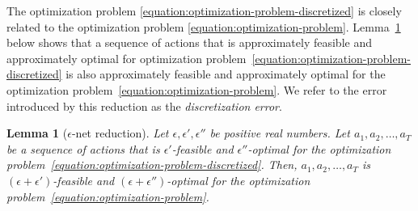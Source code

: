 \documentclass[12pt]{article}
\newtheorem{lemma}[theorem]{Lemma}
\theoremstyle{definition}
\begin{document}
The optimization problem \eqref{equation:optimization-problem-discretized} is
closely related to the optimization problem
\eqref{equation:optimization-problem}. Lemma~\ref{lemma:epsilon-net-reduction}
below shows that a sequence of actions that is approximately feasible and
approximately optimal for optimization
problem~\eqref{equation:optimization-problem-discretized} is also approximately
feasible and approximately optimal for the optimization
problem~\eqref{equation:optimization-problem}. We refer to the error introduced
by this reduction as the \emph{discretization error}.

\begin{lemma}[$\epsilon$-net reduction]
\label{lemma:epsilon-net-reduction}
Let $\epsilon, \epsilon', \epsilon''$ be positive real numbers. Let
$a_1, a_2, \dots, a_T$ be a sequence of actions that is $\epsilon'$-feasible and $\epsilon''$-optimal for
the optimization problem~\eqref{equation:optimization-problem-discretized}. Then,
$a_1, a_2, \dots, a_T$ is $(\epsilon + \epsilon')$-feasible and $(\epsilon + \epsilon'')$-optimal
for the optimization problem~\eqref{equation:optimization-problem}.
\end{lemma}
\end{document}
